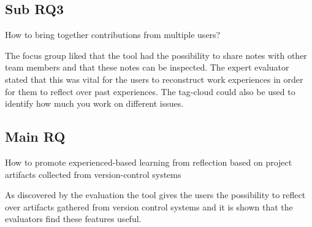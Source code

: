 \subsection{Sub RQ3}
\noindent\makebox[\linewidth]{\rule{\textwidth}{0.5pt}} 

\begin{center}
How to bring together contributions from multiple users? \\
\end{center}

\noindent\makebox[\linewidth]{\rule{\textwidth}{0.5pt}}
The focus group liked that the tool had the possibility to share notes with other team members and that these notes can be inspected. The expert evaluator stated that this was vital for the users to reconstruct work experiences in order for them to reflect over past experiences. The tag-cloud could also be used to identify how much you work on different issues.


\subsection{Main RQ}
\noindent\makebox[\linewidth]{\rule{\textwidth}{0.5pt}} 

\begin{center}
How to promote experienced-based learning from reflection based on project artifacts collected from version-control systems \\
\end{center}

\noindent\makebox[\linewidth]{\rule{\textwidth}{0.5pt}} 
As discovered by the evaluation the tool gives the users the possibility to reflect over artifacts gathered from version control systems and it is shown that the evaluators find these features useful.
